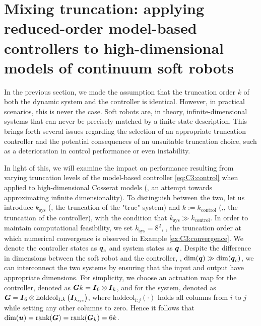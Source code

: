 \section{Mixing truncation: applying reduced-order model-based controllers to high-dimensional models of continuum soft robots}
In the previous section, we made the assumption that the truncation order $k$ of both the dynamic system and the controller is identical. However, in practical scenarios, this is never the case. Soft robots are, in theory, infinite-dimensional systems that can never be precisely matched by a finite state description. This brings forth several issues regarding the selection of an appropriate truncation controller and the potential consequences of an unsuitable truncation choice, such as a deterioration in control performance or even instability.
%

In light of this, we will examine the impact on performance resulting from varying truncation levels of the model-based controller \eqref{eq:C3:control} when applied to high-dimensional Cosserat models (\ie, an attempt towards approximating infinite dimensionality). To distinguish between the two, let us introduce $k_{\textrm{sys}}$ (\ie, the truncation of the "true" system) and $k:= k_{\textrm{control}}$ (\ie,, the truncation of the controller), with the condition that $k_{\textrm{sys}} \gg k_{\textrm{control}}$. In order to maintain computational feasibility, we set $k_\textrm{sys} = 8^2$, \ie, the truncation order at which numerical convergence is observed in Example \ref{ex:C3:convergence}. We denote the controller states as ${\boldsymbol{q}}_c$ and system states as ${\boldsymbol{q}}$. Despite the difference in dimensions between the soft robot and the controller, \ie, $\text{dim}({\boldsymbol{q}}) \gg \text{dim}({\boldsymbol{q}}_c)$, we can interconnect the two systems by ensuring that the input and output have appropriate dimensions. For simplicity, we choose an actuation map for the controller, denoted as $\boldsymbol{G}k = {\boldsymbol{I}}_6 \otimes {\boldsymbol{I}}_k$, and for the system, denoted as $\boldsymbol{G} = {\boldsymbol{I}}_6 \otimes \textrm{holdcol}_{1:k}\left( {\boldsymbol{I}}_{k_{\textrm{sys}}}\right)$, where $\textrm{holdcol}_{i:j}(\cdot)$ holds all columns from $i$ to $j$ while setting any other columns to zero. Hence it follows that $\text{dim}({\boldsymbol{u}}) = \textnormal{rank}({\boldsymbol{G}}) = \textnormal{rank}({\boldsymbol{G}}_k) = 6k$.

